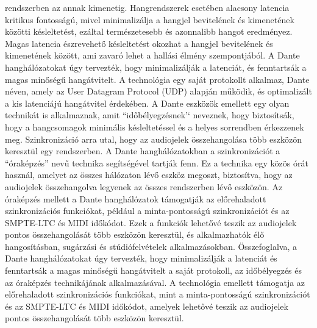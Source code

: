 rendszerben az annak kimenetig. Hangrendszerek esetében alacsony latencia
kritikus fontosságú, mivel minimalizálja a hangjel bevitelének és kimenetének
közötti késleltetést, ezáltal természetesebb és azonnalibb hangot eredményez.
Magas latencia észrevehető késleltetést okozhat a hangjel bevitelének és
kimenetének között, ami zavaró lehet a hallási élmény szempontjából. A Dante
hanghálózatokat úgy tervezték, hogy minimalizálják a latenciát, és fenntartsák a
magas minőségű hangátvitelt. A technológia egy saját protokollt alkalmaz, Dante
néven, amely az User Datagram Protocol (UDP) alapján működik, és optimalizált a
kis latenciájú hangátvitel érdekében. A Dante eszközök emellett egy olyan
technikát is alkalmaznak, amit ``időbélyegzésnek'` neveznek, hogy biztosítsák,
hogy a hangcsomagok minimális késleltetéssel és a helyes sorrendben érkezzenek
meg. Szinkronizáció arra utal, hogy az audiojelek összehangolása több eszközön
keresztül egy rendszerben. A Dante hanghálózatokban a szinkronizációt a
``óraképzés'' nevű technika segítségével tartják fenn. Ez a technika egy közös
órát használ, amelyet az összes hálózaton lévő eszköz megoszt, biztosítva, hogy
az audiojelek összehangolva legyenek az összes rendszerben lévő eszközön. Az
óraképzés mellett a Dante hanghálózatok támogatják az előrehaladott
szinkronizációs funkciókat, például a minta-pontosságú szinkronizációt és az
SMPTE-LTC és MIDI időkódot. Ezek a funkciók lehetővé teszik az audiojelek pontos
összehangolását több eszközön keresztül, és alkalmazhatók élő hangosításban,
sugárzási és stúdiófelvételek alkalmazásokban. Összefoglalva, a Dante
hanghálózatokat úgy tervezték, hogy minimalizálják a latenciát és fenntartsák a
magas minőségű hangátvitelt a saját protokoll, az időbélyegzés és az óraképzés
technikájának alkalmazásával. A technológia emellett támogatja az előrehaladott
szinkronizációs funkciókat, mint a minta-pontosságú szinkronizációt és az
SMPTE-LTC és MIDI időkódot, amelyek lehetővé teszik az audiojelek pontos
összehangolását több eszközön keresztül.
